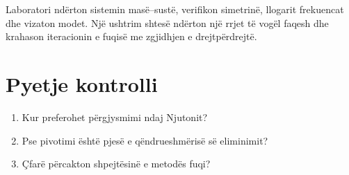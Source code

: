 \begin{lidhje}
Laboratori ndërton sistemin masë--sustë, verifikon simetrinë, llogarit frekuencat dhe vizaton modet. Një ushtrim shtesë ndërton një rrjet të vogël faqesh dhe krahason iteracionin e fuqisë me zgjidhjen e drejtpërdrejtë.
\end{lidhje}

\section*{Pyetje kontrolli}
\begin{enumerate}
\item Kur preferohet përgjysmimi ndaj Njutonit?
\item Pse pivotimi është pjesë e qëndrueshmërisë së eliminimit?
\item Çfarë përcakton shpejtësinë e metodës fuqi?
\end{enumerate}



